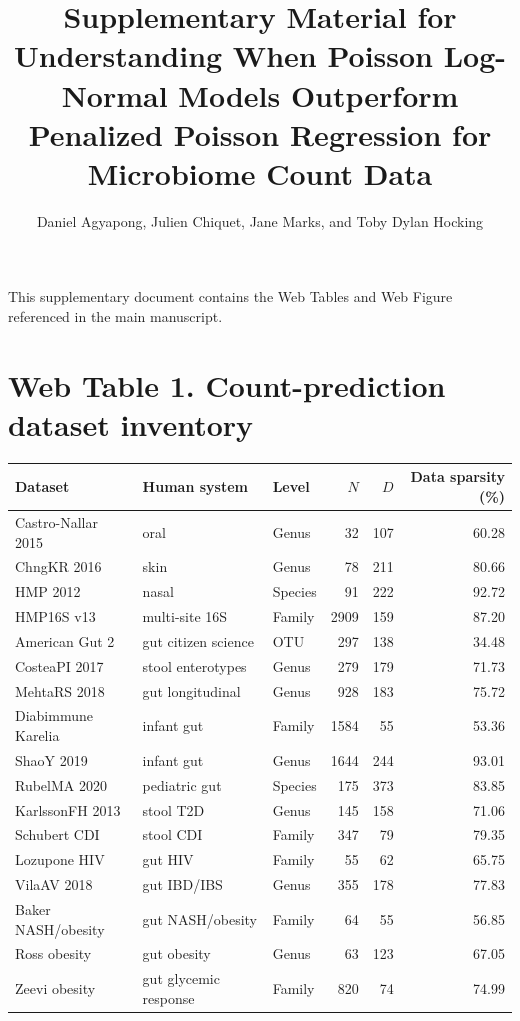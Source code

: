 \documentclass[11pt]{article}
\title{Supplementary Material for\\
Understanding When Poisson Log-Normal Models Outperform Penalized Poisson Regression for Microbiome Count Data}
\author{Daniel Agyapong, Julien Chiquet, Jane Marks, and Toby Dylan Hocking}
\date{}
\begin{document}
\maketitle

This supplementary document contains the Web Tables and Web Figure referenced in the main manuscript.

\section*{Web Table 1. Count-prediction dataset inventory}
\small
\begin{center}
\begin{tabular}{>{\raggedright\arraybackslash}p{}>{\raggedright\arraybackslash}p{}>{\raggedright\arraybackslash}p{}rrr}
\toprule
Dataset & Human system & Level & $N$ & $D$ & Data sparsity (\%) \\
\midrule
Castro-Nallar 2015 & oral & Genus & 32 & 107 & 60.28 \\
ChngKR 2016 & skin & Genus & 78 & 211 & 80.66 \\
HMP 2012 & nasal & Species & 91 & 222 & 92.72 \\
HMP16S v13 & multi-site 16S & Family & 2909 & 159 & 87.20 \\
American Gut 2 & gut citizen science & OTU & 297 & 138 & 34.48 \\
CosteaPI 2017 & stool enterotypes & Genus & 279 & 179 & 71.73 \\
MehtaRS 2018 & gut longitudinal & Genus & 928 & 183 & 75.72 \\
Diabimmune Karelia & infant gut & Family & 1584 & 55 & 53.36 \\
ShaoY 2019 & infant gut & Genus & 1644 & 244 & 93.01 \\
RubelMA 2020 & pediatric gut & Species & 175 & 373 & 83.85 \\
KarlssonFH 2013 & stool T2D & Genus & 145 & 158 & 71.06 \\
Schubert CDI & stool CDI & Family & 347 & 79 & 79.35 \\
Lozupone HIV & gut HIV & Family & 55 & 62 & 65.75 \\
VilaAV 2018 & gut IBD/IBS & Genus & 355 & 178 & 77.83 \\
Baker NASH/obesity & gut NASH/obesity & Family & 64 & 55 & 56.85 \\
Ross obesity & gut obesity & Genus & 63 & 123 & 67.05 \\
Zeevi obesity & gut glycemic response & Family & 820 & 74 & 74.99 \\

\end{tabular}
\end{center}
\end{document}
